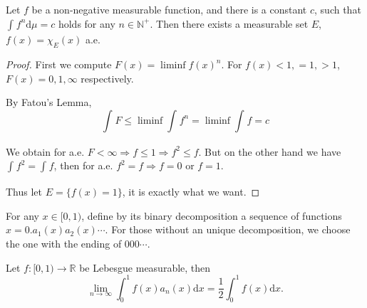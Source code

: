 \begin{problem}
Let $ f $ be a non-negative measurable function, and there is a constant $ c $, such that $
	\int_{}^{}{f^n\mathrm{d}\mu}=c
$ holds for any $ n\in \mathbb{N}^+  $. Then there exists a measurable set $ E $, $ f(x)=\chi_E(x) $ a.e.
\end{problem}

\begin{proof}
	First we compute $
		F( x ) =\liminf f( x ) ^n
	$. For $ f(x)<1,=1,>1 $, $ F(x)=0,1,\infty $ respectively.

	By Fatou's Lemma,
	$$
		\int_{}^{}{F}\le \liminf\int_{}^{}{f^n}=\liminf\int_{}^{}{f}=c
	$$

	We obtain for a.e. $ F<\infty \Rightarrow  f\le 1 \Rightarrow f^{2}\le f $. But on the other hand we have $
		\int_{}^{}{f^2}=\int_{}^{}{f}
	$, then for a.e. $ f^{2}=f \Rightarrow f=0 \text{ or } f=1 $.

	Thus let $ E=\{f(x)=1\} $, it is exactly what we want.
\end{proof}

\begin{problem}
For any $ x\in [ 0,1) $, define by its binary decomposition a sequence of functions $ x=0.a_{1}(x)a_{2}(x)\cdots $. For those without an unique decomposition, we choose the one with the ending of $ 000\cdots $.

Let $ f\colon [ 0,1  ) \to \mathbb{R}  $ be Lebesgue measurable, then
\[
	\lim_{n\to \infty} \int_0^1 f( x ) a_n( x ) \mathrm{d}x=\frac{1}{2}\int_0^1 f( x ) \mathrm{d}x.
\]
\end{problem}

